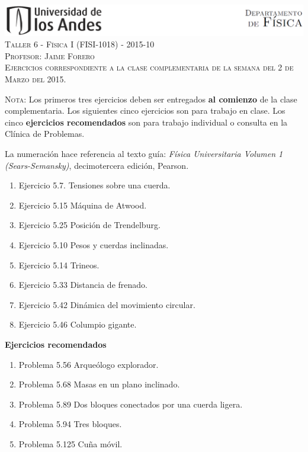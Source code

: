 \documentclass[letterpaper,10pt,onecolumn]{article}
\begin{document}
\begin{center}

\includegraphics[width=490pt]{figs/header.png}\\[0.5cm]

\textsc{\LARGE Taller 6 - F\'isica I (FISI-1018) - 2015-10}\\[0.5cm]

\textsc{\Large{Profesor: Jaime Forero}} \\[0.5cm]

\noindent\textsc{Ejercicios correspondiente a la clase complementaria
  de la semana del 2 de Marzo del 2015.}\\[0.5cm]
\end{center}

\noindent\textsc{Nota:} Los primeros tres ejercicios deben ser
entregados {\bf al comienzo} de la clase complementaria.  Los siguientes cinco ejercicios son para trabajo en clase.  
  Los cinco {\bf ejercicios recomendados}  son para trabajo
  individual o consulta en la Cl\'inica de Problemas.  

La numeraci\'on hace referencia al texto
gu\'ia: \textit{F\'isica Universitaria Volumen  1 (Sears-Semansky)},
decimotercera edici\'on, Pearson. 

\begin{enumerate}
\item Ejercicio 5.7. Tensiones sobre una cuerda.
\item Ejercicio 5.15 M\'aquina de Atwood.
\item Ejercicio 5.25 Posici\'on de Trendelburg.
\item Ejercicio 5.10 Pesos y cuerdas inclinadas.
\item Ejercicio 5.14 Trineos.
\item Ejercicio 5.33 Distancia de frenado.
\item Ejercicio 5.42 Din\'amica del movimiento circular.
\item Ejercicio 5.46 Columpio gigante.
\end{enumerate}

{\bf Ejercicios recomendados}\\
\begin{enumerate}
\item Problema 5.56 Arque\'ologo explorador.
\item Problema 5.68 Masas en un plano inclinado.
\item Problema 5.89 Dos bloques conectados por una cuerda ligera.
\item Problema 5.94 Tres bloques.
\item Problema 5.125 Cu\~na m\'ovil.
\end{enumerate}
\end{document}
